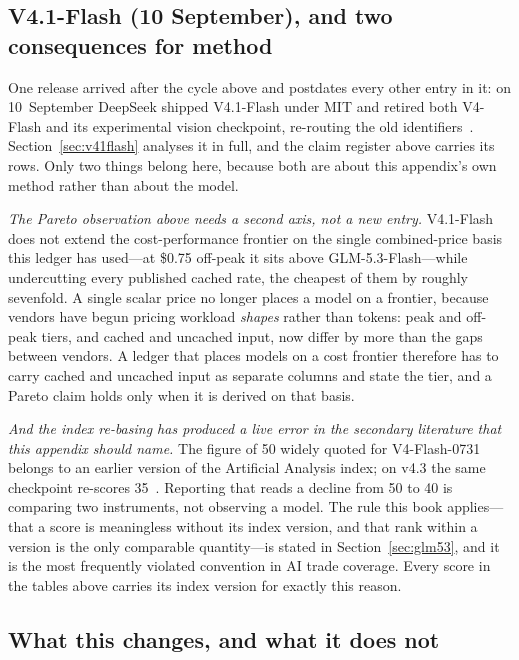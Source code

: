 \subsection{V4.1-Flash (10 September), and two consequences for method}

One release arrived after the cycle above and postdates every other entry in it: on 10~September DeepSeek shipped V4.1-Flash under MIT and retired both V4-Flash and its experimental vision checkpoint, re-routing the old identifiers~\cite{deepseek-v41flash,deepseek-v41flash-updates}. Section~\ref{sec:v41flash} analyses it in full, and the claim register above carries its rows. Only two things belong here, because both are about this appendix's own method rather than about the model.

\emph{The Pareto observation above needs a second axis, not a new entry.} V4.1-Flash does not extend the cost-performance frontier on the single combined-price basis this ledger has used---at \$0.75 off-peak it sits above GLM-5.3-Flash---while undercutting every published cached rate, the cheapest of them by roughly sevenfold. A single scalar price no longer places a model on a frontier, because vendors have begun pricing workload \emph{shapes} rather than tokens: peak and off-peak tiers, and cached and uncached input, now differ by more than the gaps between vendors. A ledger that places models on a cost frontier therefore has to carry cached and uncached input as separate columns and state the tier, and a Pareto claim holds only when it is derived on that basis.

\emph{And the index re-basing has produced a live error in the secondary literature that this appendix should name.} The figure of 50 widely quoted for V4-Flash-0731 belongs to an earlier version of the Artificial Analysis index; on v4.3 the same checkpoint re-scores 35~\cite{aa-v41flash}. Reporting that reads a decline from 50 to 40 is comparing two instruments, not observing a model. The rule this book applies---that a score is meaningless without its index version, and that rank within a version is the only comparable quantity---is stated in Section~\ref{sec:glm53}, and it is the most frequently violated convention in AI trade coverage. Every score in the tables above carries its index version for exactly this reason.

\subsection{What this changes, and what it does not}

